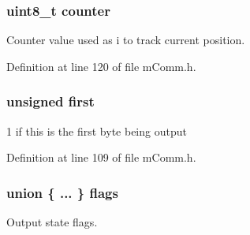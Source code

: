 \hypertarget{structm_comm___output_vector_a0480b812cba9c1d9c71a5fb1071bd0fc}{}
\subsubsection[{counter}]{\setlength{\rightskip}{0pt plus 5cm}uint8\+\_\+t counter}\label{structm_comm___output_vector_a0480b812cba9c1d9c71a5fb1071bd0fc}


Counter value used as \textquotesingle{}i\textquotesingle{} to track current position. 



Definition at line 120 of file m\+Comm.\+h.

\hypertarget{structm_comm___output_vector_a1672231b4c403877a69e1104ad69e006}{}
\subsubsection[{first}]{\setlength{\rightskip}{0pt plus 5cm}unsigned first}\label{structm_comm___output_vector_a1672231b4c403877a69e1104ad69e006}


\textquotesingle{}1\textquotesingle{} if this is the first byte being output 



Definition at line 109 of file m\+Comm.\+h.

\hypertarget{structm_comm___output_vector_a146befb66ff5895b34928d130b1568f2}{}
\subsubsection[{flags}]{\setlength{\rightskip}{0pt plus 5cm}union \{ ... \}   flags}\label{structm_comm___output_vector_a146befb66ff5895b34928d130b1568f2}


Output state flags. 

\hypertarget{structm_comm___output_vector_ad64db6943e903d2e5a131c1df1799aef}{}

